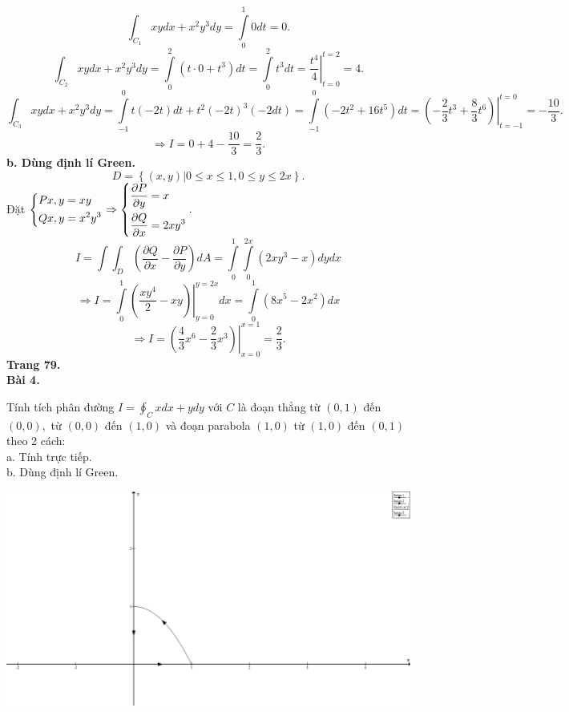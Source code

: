 \documentclass[12pt,a4paper]{article}
\begin{document}
\[\int_{{C_1}} {xydx + {x^2}{y^3}dy}  = \int\limits_0^1 {0dt}  = 0.\]
\[\int_{{C_2}} {xydx + {x^2}{y^3}dy}  = \int\limits_0^2 {\left( {t \cdot 0 + {t^3}} \right)} dt = \int\limits_0^2 {{t^3}} dt = \left. {\frac{{{t^4}}}{4}} \right|_{t = 0}^{t = 2} = 4.\]
\[\int_{{C_3}} {xydx + {x^2}{y^3}dy}  = \int\limits_{ - 1}^0 {t\left( { - 2t} \right)} dt + {t^2}{\left( { - 2t} \right)^3}\left( { - 2dt} \right) = \int\limits_{ - 1}^0 {\left( { - 2{t^2} + 16{t^5}} \right)dt = \left. {\left( { - \frac{2}{3}{t^3} + \frac{8}{3}{t^6}} \right)} \right|} _{t =  - 1}^{t = 0} =  - \frac{{10}}{3}.\]
\[ \Rightarrow I = 0 + 4 - \frac{{10}}{3} = \frac{2}{3}.\]
\textbf{b. Dùng định lí Green.}
\[D = \left\{ {\left. {\left( {x,y} \right)} \right|0 \leqslant x \leqslant 1,0 \leqslant y \leqslant 2x} \right\}.\]
Đặt \(\left\{ \begin{gathered}
  Px,y = xy \hfill \\
  Qx,y = {x^2}{y^3} \hfill \\ 
\end{gathered}  \right. \Rightarrow \left\{ \begin{gathered}
  \frac{{\partial P}}{{\partial y}} = x \hfill \\
  \frac{{\partial Q}}{{\partial x}} = 2x{y^3} \hfill \\ 
\end{gathered}  \right..\)
\[I = \int {\int_D {\left( {\frac{{\partial Q}}{{\partial x}} - \frac{{\partial P}}{{\partial y}}} \right)} } dA = \int\limits_0^1 {\int\limits_0^{2x} {\left( {2x{y^3} - x} \right)} dydx} \]
\[ \Rightarrow I = \int\limits_0^1 {\left. {\left( {\frac{{x{y^4}}}{2} - xy} \right)} \right|} _{y = 0}^{y = 2x}dx = \int\limits_0^1 {\left( {8{x^5} - 2{x^2}} \right)} dx\]
\[ \Rightarrow I = \left. {\left( {\frac{4}{3}{x^6} - \frac{2}{3}{x^3}} \right)} \right|_{x = 0}^{x = 1} = \frac{2}{3}.\]
\textbf{Trang 79.}\\
\textbf{Bài 4.}
\begin{mybox}
Tính tích phân đường \(I = \oint_C {xdx + ydy} \) với \(C\) là đoạn thẳng từ \(\left( {0,1} \right)\) đến \(\left( {0,0} \right),\) từ \(\left( {0,0} \right)\) đến \(\left( {1,0} \right)\) và đoạn parabola \(\left( {1,0} \right)\) từ \(\left( {1,0} \right)\) đến \(\left( {0,1} \right)\) theo 2 cách:\\
a. Tính trực tiếp.\\
b. Dùng định lí Green.
\end{mybox}
\begin{center}
	\includegraphics[scale=0.3]{c4_9}
\end{center}
\end{document}
